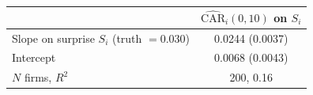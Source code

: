 \begin{tabular}{lc}\toprule
 & $\widehat{\text{CAR}}_i(0,10)$ on $S_i$ \\ \midrule
Slope on surprise $S_i$ (truth $= 0.030$) & 0.0244 (0.0037) \\
Intercept & 0.0068 (0.0043) \\
$N$ firms, $R^2$ & 200, 0.16 \\
\bottomrule\end{tabular}
